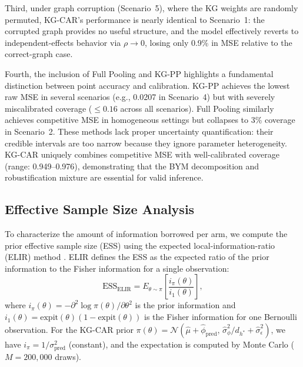 \documentclass[12pt]{article}
\begin{document}
Third, under graph corruption (Scenario~5), where the KG weights are randomly permuted, KG-CAR's performance is nearly identical to Scenario~1: the corrupted graph provides no useful structure, and the model effectively reverts to independent-effects behavior via $\rho \to 0$, losing only 0.9\% in MSE relative to the correct-graph case.

Fourth, the inclusion of Full Pooling and KG-PP highlights a fundamental distinction between point accuracy and calibration. KG-PP achieves the lowest raw MSE in several scenarios (e.g., 0.0207 in Scenario~4) but with severely miscalibrated coverage ($\leq 0.16$ across all scenarios). Full Pooling similarly achieves competitive MSE in homogeneous settings but collapses to 3\% coverage in Scenario~2. These methods lack proper uncertainty quantification: their credible intervals are too narrow because they ignore parameter heterogeneity. KG-CAR uniquely combines competitive MSE with well-calibrated coverage (range: 0.949--0.976), demonstrating that the BYM decomposition and robustification mixture are essential for valid inference.

\subsection{Effective Sample Size Analysis}
\label{sec:ess}

To characterize the amount of information borrowed per arm, we compute the prior effective sample size (ESS) using the expected local-information-ratio (ELIR) method \citep{neuenschwander2020predictively}. ELIR defines the ESS as the expected ratio of the prior information to the Fisher information for a single observation:
\begin{equation}
\text{ESS}_{\text{ELIR}} = E_{\theta \sim \pi}\!\left[\frac{i_\pi(\theta)}{i_1(\theta)}\right],
\label{eq:elir}
\end{equation}
where $i_\pi(\theta) = -\partial^2 \log \pi(\theta) / \partial \theta^2$ is the prior information and $i_1(\theta) = \text{expit}(\theta)(1 - \text{expit}(\theta))$ is the Fisher information for one Bernoulli observation. For the KG-CAR prior $\pi(\theta) = \mathcal{N}(\hat\mu + \hat\phi_{\text{pred}},\, \hat\sigma_\phi^2/d_{h^*} + \hat\sigma_\epsilon^2)$, we have $i_\pi = 1/\sigma^2_{\text{pred}}$ (constant), and the expectation is computed by Monte Carlo ($M = 200{,}000$ draws).
\end{document}
